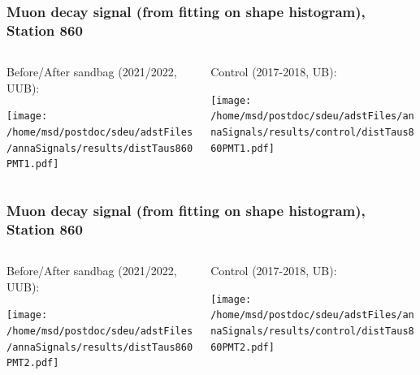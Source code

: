 \documentclass[aspectratio=169]{beamer}
\begin{document}

\begin{frame}
  \frametitle{Muon decay signal (from fitting on shape histogram), Station 860}
  
  \begin{columns}[T,c]
    \begin{column}{.5\textwidth}
      Before/After sandbag (2021/2022, UUB):
      \vspace{.3cm}

      \texttt{[image: /home/msd/postdoc/sdeu/adstFiles/annaSignals/results/distTaus860PMT1.pdf]}
    \end{column}
    \begin{column}{.5\textwidth}
      Control (2017-2018, UB):
      \vspace{0.3cm}

      \texttt{[image: /home/msd/postdoc/sdeu/adstFiles/annaSignals/results/control/distTaus860PMT1.pdf]}
    \end{column}
  \end{columns}
\end{frame}

\begin{frame}
  \frametitle{Muon decay signal (from fitting on shape histogram), Station 860}
  
  \begin{columns}[T,c]
    \begin{column}{.5\textwidth}
      Before/After sandbag (2021/2022, UUB):
      \vspace{.3cm}

      \texttt{[image: /home/msd/postdoc/sdeu/adstFiles/annaSignals/results/distTaus860PMT2.pdf]}
    \end{column}
    \begin{column}{.5\textwidth}
      Control (2017-2018, UB):
      \vspace{0.3cm}

      \texttt{[image: /home/msd/postdoc/sdeu/adstFiles/annaSignals/results/control/distTaus860PMT2.pdf]}
    \end{column}    
\end{columns}
\end{frame}
\end{document}
